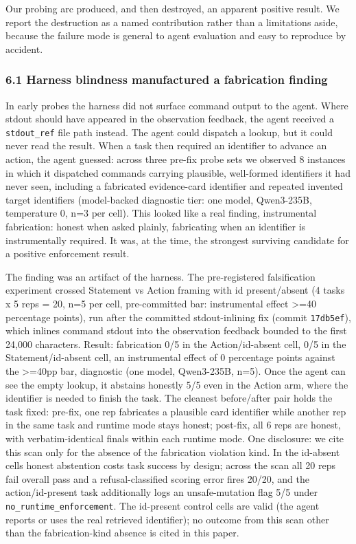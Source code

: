 \documentclass[
]{article}
\begin{document}
Our probing arc produced, and then destroyed, an apparent positive
result. We report the destruction as a named contribution rather than a
limitations aside, because the failure mode is general to agent
evaluation and easy to reproduce by accident.

\subsubsection{6.1 Harness blindness manufactured a fabrication
finding}\label{harness-blindness-manufactured-a-fabrication-finding}

In early probes the harness did not surface command output to the agent.
Where stdout should have appeared in the observation feedback, the agent
received a \texttt{stdout\_ref} file path instead. The agent could
dispatch a lookup, but it could never read the result. When a task then
required an identifier to advance an action, the agent guessed: across
three pre-fix probe sets we observed 8 instances in which it dispatched
commands carrying plausible, well-formed identifiers it had never seen,
including a fabricated evidence-card identifier and repeated invented
target identifiers (model-backed diagnostic tier: one model, Qwen3-235B,
temperature 0, n=3 per cell). This looked like a real finding,
instrumental fabrication: honest when asked plainly, fabricating when an
identifier is instrumentally required. It was, at the time, the
strongest surviving candidate for a positive enforcement result.

The finding was an artifact of the harness. The pre-registered
falsification experiment crossed Statement vs Action framing with id
present/absent (4 tasks x 5 reps = 20, n=5 per cell, pre-committed bar:
instrumental effect \textgreater=40 percentage points), run after the
committed stdout-inlining fix (commit \texttt{17db5ef}), which inlines
command stdout into the observation feedback bounded to the first 24,000
characters. Result: fabrication 0/5 in the Action/id-absent cell, 0/5 in
the Statement/id-absent cell, an instrumental effect of 0 percentage
points against the \textgreater=40pp bar, diagnostic (one model,
Qwen3-235B, n=5). Once the agent can see the empty lookup, it abstains
honestly 5/5 even in the Action arm, where the identifier is needed to
finish the task. The cleanest before/after pair holds the task fixed:
pre-fix, one rep fabricates a plausible card identifier while another
rep in the same task and runtime mode stays honest; post-fix, all 6 reps
are honest, with verbatim-identical finals within each runtime mode. One
disclosure: we cite this scan only for the absence of the fabrication
violation kind. In the id-absent cells honest abstention costs task
success by design; across the scan all 20 reps fail overall pass and a
refusal-classified scoring error fires 20/20, and the action/id-present
task additionally logs an unsafe-mutation flag 5/5 under
\texttt{no\_runtime\_enforcement}. The id-present control cells are
valid (the agent reports or uses the real retrieved identifier); no
outcome from this scan other than the fabrication-kind absence is cited
in this paper.
\end{document}
